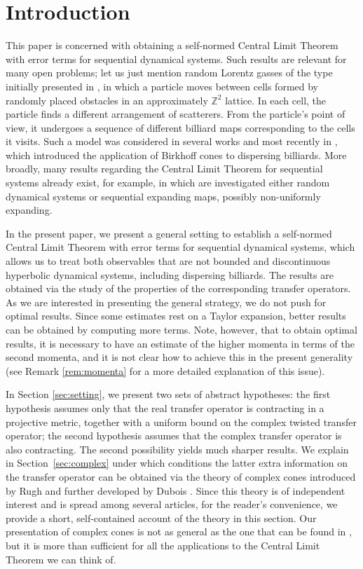 \documentclass{amsart}
\numberwithin{equation}{section}
\begin{document}
\section{Introduction}
This paper is concerned with obtaining a self-normed Central Limit Theorem with error terms for 
sequential dynamical systems. 
Such results are relevant for many open problems; let us just mention random 
Lorentz gasses of the type initially presented in \cite{Le03}, in which a particle moves between cells formed by randomly placed obstacles
in an approximately $\mathbb{Z}^2$ lattice.  In each cell, the particle finds a different arrangement of scatterers.  
From the particle's point of
view, it undergoes a sequence of different billiard maps corresponding to the cells it visits.  Such a model was 
considered in several works \cite{Le03, Le06, AL20} and most recently in \cite{DL22}, which introduced the application
of Birkhoff cones to dispersing billiards. 
More broadly, many results regarding the Central Limit Theorem for sequential systems already exist, for example, \cite{CR07,NMTV, NTV18, HS20, H20, LS20, KL21, NFT21, S22, DK23} in which are investigated either random dynamical systems or sequential expanding maps, possibly non-uniformly expanding. 

In the present paper, we present a general setting to establish a self-normed Central Limit Theorem with error terms for sequential dynamical systems, which allows us to treat both observables that are not bounded and discontinuous hyperbolic dynamical systems, including dispersing billiards. The results are obtained via the study of the properties of the corresponding transfer operators. As we are interested in presenting the general strategy, we do not push for optimal results. Since some estimates rest on a Taylor expansion, better results can be obtained by computing more terms. Note, however, that to obtain optimal results, it is necessary to have an estimate of the
 higher momenta in terms of the second momenta, and it is not clear how to achieve this in the present generality (see Remark \ref{rem:momenta} for a more detailed explanation
of this issue).

In Section \ref{sec:setting}, we present two sets of abstract hypotheses:  the first hypothesis assumes only that the real transfer operator is contracting in a projective metric, together with a uniform bound on the complex twisted transfer operator; the second hypothesis assumes that the complex transfer operator is also contracting. The second possibility yields much sharper results. We explain in Section~\ref{sec:complex} under which conditions the latter extra information on the transfer operator can be obtained via the theory of complex cones introduced by Rugh \cite{Ru10} and further developed by Dubois \cite{Du09, Du11}. Since this theory is of independent interest and is spread among several articles, for the reader's convenience, we provide a short, self-contained account of the theory in this section. Our presentation of complex cones is not as 
general as the one that can be found in \cite{Ru10, Du09, Du11}, but it is more than sufficient for all the applications 
to the Central Limit Theorem we can think of.
\end{document}
